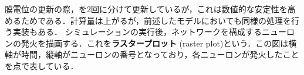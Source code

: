 膜電位の更新の際，を2回に分けて更新しているが，これは数値的な安定性を高めるためである．計算量は上がるが，前述したモデルにおいても同様の処理を行う実装もある．
シミュレーションの実行後，ネットワークを構成するニューロンの発火を描画する．これを\textbf{ラスタープロット} (raster plot)という．この図は横軸が時間，縦軸がニューロンの番号となっており，各ニューロンが発火したことを点で表している．